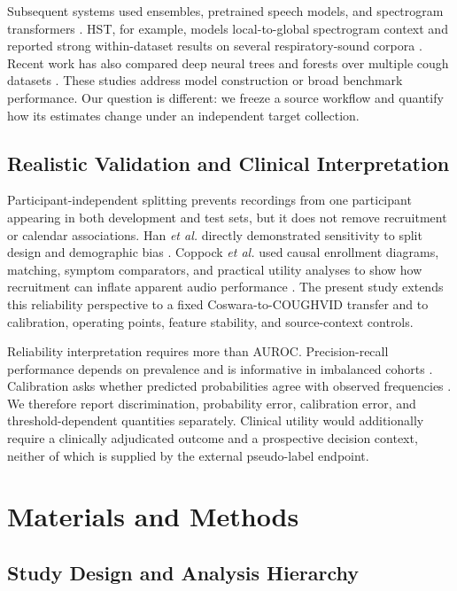 \documentclass[journal]{IEEEtran}
\begin{document}
Subsequent systems used ensembles, pretrained speech models, and spectrogram transformers \cite{mohammed2021ensemble,ponomarchuk2022achoo,aytekin2024hst,wang2022wavlm}. HST, for example, models local-to-global spectrogram context and reported strong within-dataset results on several respiratory-sound corpora \cite{aytekin2024hst}. Recent work has also compared deep neural trees and forests over multiple cough datasets \cite{islam2026dndf}. These studies address model construction or broad benchmark performance. Our question is different: we freeze a source workflow and quantify how its estimates change under an independent target collection.

\subsection{Realistic Validation and Clinical Interpretation}

Participant-independent splitting prevents recordings from one participant appearing in both development and test sets, but it does not remove recruitment or calendar associations. Han \emph{et al.} directly demonstrated sensitivity to split design and demographic bias \cite{han2022sounds}. Coppock \emph{et al.} used causal enrollment diagrams, matching, symptom comparators, and practical utility analyses to show how recruitment can inflate apparent audio performance \cite{coppock2024symptoms}. The present study extends this reliability perspective to a fixed Coswara-to-COUGHVID transfer and to calibration, operating points, feature stability, and source-context controls.

Reliability interpretation requires more than AUROC. Precision-recall performance depends on prevalence and is informative in imbalanced cohorts \cite{saito2015auprc}. Calibration asks whether predicted probabilities agree with observed frequencies \cite{vancalster2019calibration}. We therefore report discrimination, probability error, calibration error, and threshold-dependent quantities separately. Clinical utility would additionally require a clinically adjudicated outcome and a prospective decision context, neither of which is supplied by the external pseudo-label endpoint.

\section{Materials and Methods}

\subsection{Study Design and Analysis Hierarchy}
\end{document}
